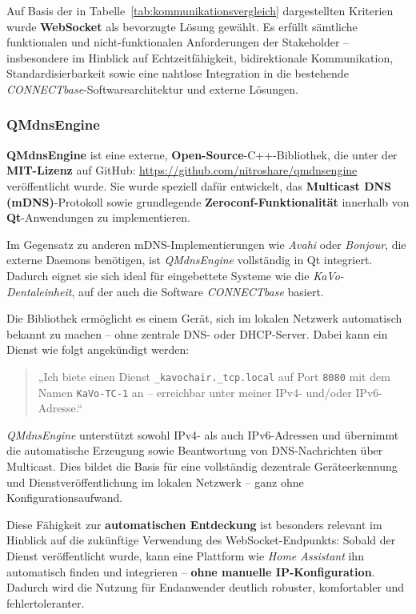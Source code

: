 \vspace{1em}
\noindent
Auf Basis der in Tabelle~\ref{tab:kommunikationsvergleich} dargestellten Kriterien wurde \textbf{WebSocket} als bevorzugte Lösung gewählt. Es erfüllt sämtliche funktionalen und nicht-funktionalen Anforderungen der Stakeholder – insbesondere im Hinblick auf Echtzeitfähigkeit, bidirektionale Kommunikation, Standardisierbarkeit sowie eine nahtlose Integration in die bestehende \textit{CONNECTbase}-Softwarearchitektur und externe Lösungen.

\subsubsection{QMdnsEngine}

\textbf{QMdnsEngine} ist eine externe, \textbf{Open-Source}-C++-Bibliothek, die unter der \textbf{MIT-Lizenz} auf GitHub: {\url{https://github.com/nitroshare/qmdnsengine}} veröffentlicht wurde. Sie wurde speziell dafür entwickelt, das \textbf{Multicast DNS (mDNS)}-Protokoll sowie grundlegende \textbf{Zeroconf-Funktionalität} innerhalb von \textbf{Qt}-Anwendungen zu implementieren. 

Im Gegensatz zu anderen mDNS-Implementierungen wie \textit{Avahi} oder \textit{Bonjour}, die externe Daemons benötigen, ist \textit{QMdnsEngine} vollständig in Qt integriert. Dadurch eignet sie sich ideal für eingebettete Systeme wie die \textit{KaVo-Dentaleinheit}, auf der auch die Software \textit{CONNECTbase} basiert.

Die Bibliothek ermöglicht es einem Gerät, sich im lokalen Netzwerk automatisch bekannt zu machen – ohne zentrale DNS- oder DHCP-Server. Dabei kann ein Dienst wie folgt angekündigt werden:

\begin{quote}
„Ich biete einen Dienst \texttt{\_kavochair.\_tcp.local} auf Port \texttt{8080} mit dem Namen \texttt{KaVo-TC-1} an -- erreichbar unter meiner IPv4- und/oder IPv6-Adresse.“
\end{quote}

\textit{QMdnsEngine} unterstützt sowohl IPv4- als auch IPv6-Adressen und übernimmt die automatische Erzeugung sowie Beantwortung von DNS-Nachrichten über Multicast. Dies bildet die Basis für eine vollständig dezentrale Geräteerkennung und Dienstveröffentlichung im lokalen Netzwerk – ganz ohne Konfigurationsaufwand.

Diese Fähigkeit zur \textbf{automatischen Entdeckung} ist besonders relevant im Hinblick auf die zukünftige Verwendung des WebSocket-Endpunkts: Sobald der Dienst veröffentlicht wurde, kann eine Plattform wie \textit{Home Assistant} ihn automatisch finden und integrieren – \textbf{ohne manuelle IP-Konfiguration}. Dadurch wird die Nutzung für Endanwender deutlich robuster, komfortabler und fehlertoleranter.


